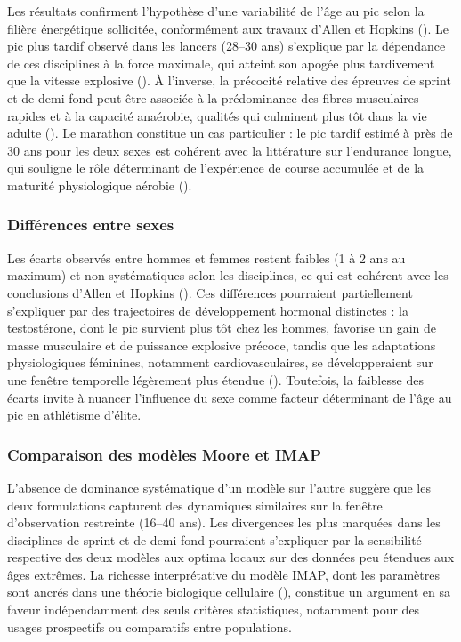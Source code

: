 \documentclass[
  french,
  11pt,
  a4paper,
]{article}
\begin{document}
Les résultats confirment l'hypothèse d'une variabilité de l'âge au pic
selon la filière énergétique sollicitée, conformément aux travaux
d'Allen et Hopkins (). Le
pic plus tardif observé dans les lancers (28--30 ans) s'explique par la
dépendance de ces disciplines à la force maximale, qui atteint son
apogée plus tardivement que la vitesse explosive
(). À l'inverse, la précocité relative
des épreuves de sprint et de demi-fond peut être associée à la
prédominance des fibres musculaires rapides et à la capacité anaérobie,
qualités qui culminent plus tôt dans la vie adulte
(). Le marathon constitue
un cas particulier : le pic tardif estimé à près de 30 ans pour les deux
sexes est cohérent avec la littérature sur l'endurance longue, qui
souligne le rôle déterminant de l'expérience de course accumulée et de
la maturité physiologique aérobie ().

\subsubsection{Différences entre
sexes}\label{diffuxe9rences-entre-sexes}

Les écarts observés entre hommes et femmes restent faibles (1 à 2 ans au
maximum) et non systématiques selon les disciplines, ce qui est cohérent
avec les conclusions d'Allen et Hopkins (). Ces différences pourraient partiellement s'expliquer
par des trajectoires de développement hormonal distinctes : la
testostérone, dont le pic survient plus tôt chez les hommes, favorise un
gain de masse musculaire et de puissance explosive précoce, tandis que
les adaptations physiologiques féminines, notamment cardiovasculaires,
se développeraient sur une fenêtre temporelle légèrement plus étendue
(). Toutefois,
la faiblesse des écarts invite à nuancer l'influence du sexe comme
facteur déterminant de l'âge au pic en athlétisme d'élite.

\subsubsection{Comparaison des modèles Moore et
IMAP}\label{comparaison-des-moduxe8les-moore-et-imap-1}

L'absence de dominance systématique d'un modèle sur l'autre suggère que
les deux formulations capturent des dynamiques similaires sur la fenêtre
d'observation restreinte (16--40 ans). Les divergences les plus marquées
dans les disciplines de sprint et de demi-fond pourraient s'expliquer
par la sensibilité respective des deux modèles aux optima locaux sur des
données peu étendues aux âges extrêmes. La richesse interprétative du
modèle IMAP, dont les paramètres sont ancrés dans une théorie biologique
cellulaire (),
constitue un argument en sa faveur indépendamment des seuls critères
statistiques, notamment pour des usages prospectifs ou comparatifs entre
populations. \newpage
\end{document}
